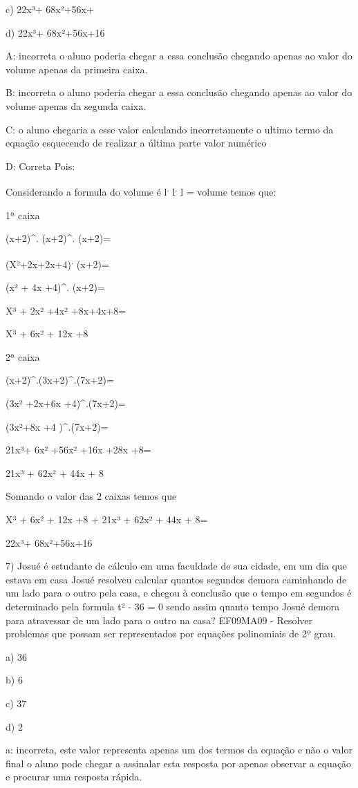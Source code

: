 c) 22x³+ 68x²+56x+

d) 22x³+ 68x²+56x+16

A: incorreta o aluno poderia chegar a essa conclusão chegando apenas ao
valor do volume apenas da primeira caixa.

B: incorreta o aluno poderia chegar a essa conclusão chegando apenas ao
valor do volume apenas da segunda caixa.

C: o aluno chegaria a esse valor calculando incorretamente o ultimo
termo da equação esquecendo de realizar a última parte valor numérico

D: Correta Pois:

Considerando a formula do volume é l\textsuperscript{.}
l\textsuperscript{.} l = volume temos que:

1ª caixa

(x+2)^{.} (x+2)^{.} (x+2)=

(X²+2x+2x+4)\textsuperscript{.} (x+2)=

(x² + 4x +4)^{.} (x+2)=

X³ + 2x² +4x² +8x+4x+8=

X³ + 6x² + 12x +8

2ª caixa

(x+2)^{.(}3x+2)^{.(}7x+2)=

(3x² +2x+6x +4)^{.}(7x+2)=

(3x²+8x +4 )^{.}(7x+2)=

21x³+ 6x² +56x² +16x +28x +8=

21x³ + 62x² + 44x + 8

Somando o valor das 2 caixas temos que

X³ + 6x² + 12x +8 + 21x³ + 62x² + 44x + 8=

22x³+ 68x²+56x+16

7) Josué é estudante de cálculo em uma faculdade de sua cidade, em um
dia que estava em casa Josué resolveu calcular quantos segundos demora
caminhando de um lado para o outro pela casa, e chegou à conclusão que o
tempo em segundos é determinado pela formula t² - 36 = 0 sendo assim
quanto tempo Josué demora para atravessar de um lado para o outro na
casa? EF09MA09 - Resolver problemas que possam ser representados por
equações polinomiais de 2º grau.

a) 36

b) 6

c) 37

d) 2

a: incorreta, este valor representa apenas um dos termos da equação e
não o valor final o aluno pode chegar a assinalar esta resposta por
apenas observar a equação e procurar uma resposta rápida.

